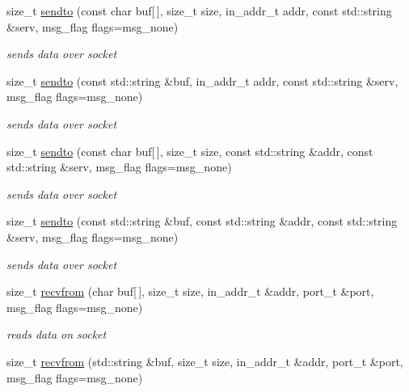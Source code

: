 \begin{CompactItemize}
\begin{CompactItemize}
size\_\-t \hyperlink{classsocketpp_1_1BaseSocket_ca4c0bbe94058654d01b82d517c9c590}{sendto} (const char buf\mbox{[}$\,$\mbox{]}, size\_\-t size, in\_\-addr\_\-t addr, const std::string \&serv, msg\_\-flag flags=msg\_\-none)
\begin{CompactList}\small\item\em sends data over socket \item\end{CompactList}\item 
size\_\-t \hyperlink{classsocketpp_1_1BaseSocket_8ffad80d557d9d77e681742c177522f2}{sendto} (const std::string \&buf, in\_\-addr\_\-t addr, const std::string \&serv, msg\_\-flag flags=msg\_\-none)
\begin{CompactList}\small\item\em sends data over socket \item\end{CompactList}\item 
size\_\-t \hyperlink{classsocketpp_1_1BaseSocket_d12f0e8c85c766765fe9d88dc4833dcc}{sendto} (const char buf\mbox{[}$\,$\mbox{]}, size\_\-t size, const std::string \&addr, const std::string \&serv, msg\_\-flag flags=msg\_\-none)
\begin{CompactList}\small\item\em sends data over socket \item\end{CompactList}\item 
size\_\-t \hyperlink{classsocketpp_1_1BaseSocket_1bcaa3e5552273e0ef51811bd6987dc8}{sendto} (const std::string \&buf, const std::string \&addr, const std::string \&serv, msg\_\-flag flags=msg\_\-none)
\begin{CompactList}\small\item\em sends data over socket \item\end{CompactList}\item 
size\_\-t \hyperlink{classsocketpp_1_1BaseSocket_6a207860c0a1328dc05bea32bb62e81f}{recvfrom} (char buf\mbox{[}$\,$\mbox{]}, size\_\-t size, in\_\-addr\_\-t \&addr, port\_\-t \&port, msg\_\-flag flags=msg\_\-none)
\begin{CompactList}\small\item\em reads data on socket \item\end{CompactList}\item 
size\_\-t \hyperlink{classsocketpp_1_1BaseSocket_8241347ca77942e2bb1449d117ac7248}{recvfrom} (std::string \&buf, size\_\-t size, in\_\-addr\_\-t \&addr, port\_\-t \&port, msg\_\-flag flags=msg\_\-none)

\end{CompactItemize}
\end{CompactItemize}

